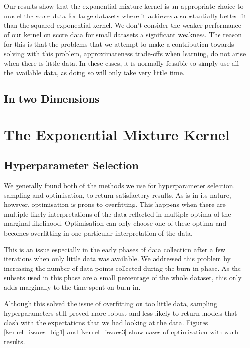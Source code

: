 \documentclass[a4paper,12pt,twoside,openright]{report}
\begin{document}
Our results show that the exponential mixture kernel is an appropriate choice to model the score data for large datasets where it achieves a substantially better fit than the squared exponential kernel. We don't consider the weaker performance of our kernel on score data for small datasets a significant weakness. The reason for this is that the problems that we attempt to make a contribution towards solving with this problem, approximateness trade-offs when learning, do not arise when there is little data. In these cases, it is normally feasible to simply use all the available data, as doing so will only take very little time.

\subsection{In two Dimensions}


\section{The Exponential Mixture Kernel}

\subsection{Hyperparameter Selection}

We generally found both of the methods we use for hyperparameter selection, sampling and optimisation, to return satisfactory results. As is in its nature, however, optimisation is prone to overfitting. This happens when there are multiple likely interpretations of the data reflected in multiple optima of the marginal likelihood. Optimisation can only choose one of these optima and becomes overfitting in one particular interpretation of the data.

This is an issue especially in the early phases of data collection after a few iterations when only little data was available. We addressed this problem by increasing the number of data points collected during the burn-in phase. As the subsets used in this phase are a small percentage of the whole dataset, this only adds marginally to the time spent on burn-in.

Although this solved the issue of overfitting on too little data, sampling hyperparameters still proved more robust and less likely to return models that clash with the expectations that we had looking at the data. Figures \ref{kernel_issues_big1} and \ref{kernel_issues3} show cases of optimisation with such results.
\end{document}
